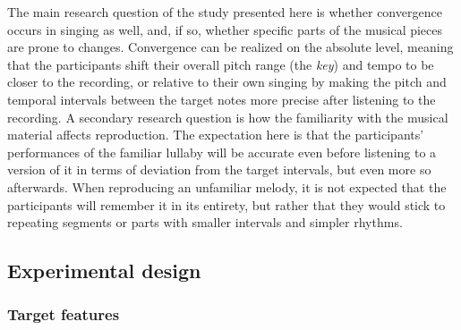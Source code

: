 The main research question of the study presented here is whether convergence occurs in singing as well, and, if so, whether specific parts of the musical pieces are prone to changes.
Convergence can be realized on the absolute level, meaning that the participants shift their overall pitch range (the \emph{key}) and tempo to be closer to the recording, or relative to their own singing by making the pitch and temporal intervals between the target notes more precise after listening to the recording.
A secondary research question is how the familiarity with the musical material affects reproduction.
The expectation here is that the participants' performances of the familiar lullaby will be accurate even before listening to a version of it in terms of deviation from the target intervals, but even more so afterwards.
When reproducing an unfamiliar melody, it is not expected that the participants will remember it in its entirety, but rather that they would stick to repeating segments or parts with smaller intervals and simpler rhythms.


\subsection{Experimental design}
\label{subsec:design_music}

\subsubsection{Target features}
\label{subsubsec:target_features_music}

